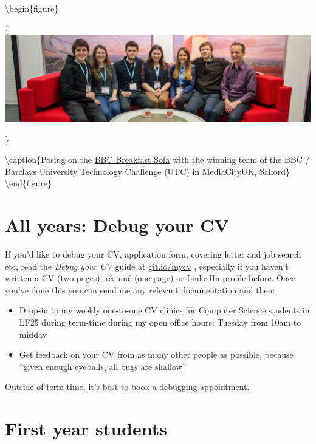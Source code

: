 \documentclass[
  12pt,
]{book}
\providecommand{\tightlist}{%
  \setlength{\itemsep}{0pt}\setlength{\parskip}{0pt}}
\begin{document}
\textbackslash begin\{figure\}

\{\centering \includegraphics[width=1\linewidth]{images/bbcbreakfastsofa}

\}

\textbackslash caption\{Posing on the \href{https://en.wikipedia.org/wiki/BBC_Breakfast}{BBC Breakfast Sofa} with the winning team of the BBC / Barclays University Technology Challenge (UTC) in \href{https://en.wikipedia.org/wiki/MediaCityUK}{MediaCityUK}, Salford\}\label{fig:unnamed-chunk-1}
\textbackslash end\{figure\}

\hypertarget{allyears}{%
\section{All years: Debug your CV}\label{allyears}}

If you'd like to debug your CV, application form, covering letter and job search etc, read the \emph{Debug your CV} guide at \href{http://git.io/mycv}{git.io/mycv} \citep{debugyourcv}, especially if you haven't written a CV (two pages), résumé (one page) or LinkedIn profile before. Once you've done this you can send me any relevant documentation and then:

\begin{itemize}
\tightlist
\item
  Drop-in to my weekly one-to-one CV clinics for Computer Science students in LF25 during term-time during my open office hours: Tuesday from 10am to midday
\item
  Get feedback on your CV from as many other people as possible, because ``\href{https://en.wikipedia.org/wiki/Linus\%27s_law}{given enough eyeballs, all bugs are shallow}'' \citep{Raymond1999}
\end{itemize}

Outside of term time, it's best to book a debugging appointment. 🐛

\hypertarget{year1}{%
\section{First year students}\label{year1}}
\end{document}
